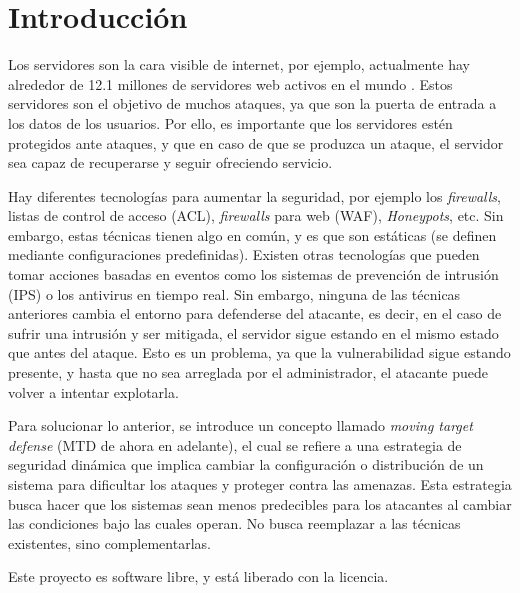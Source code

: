 \chapter{Introducción}

Los servidores son la cara visible de internet, por ejemplo, actualmente hay alrededor de 12.1 millones de servidores web activos en el mundo \cite{netcraft-agosto23}. Estos servidores son el objetivo de muchos ataques, ya que son la puerta de entrada a los datos de los usuarios.\cite{breaches-2023} Por ello, es importante que los servidores estén protegidos ante ataques, y que en caso de que se produzca un ataque, el servidor sea capaz de recuperarse y seguir ofreciendo servicio.

Hay diferentes tecnologías para aumentar la seguridad, por ejemplo los \textit{firewalls}, listas de control de acceso (ACL), \textit{firewalls} para web (WAF), \textit{Honeypots}, etc. Sin embargo, estas técnicas tienen algo en común, y es que son estáticas (se definen mediante configuraciones predefinidas). Existen otras tecnologías que pueden tomar acciones basadas en eventos como los sistemas de prevención de intrusión (IPS) o los antivirus en tiempo real. Sin embargo, ninguna de las técnicas anteriores cambia el entorno para defenderse del atacante, es decir, en el caso de sufrir una intrusión y ser mitigada, el servidor sigue estando en el mismo estado que antes del ataque. Esto es un problema, ya que la vulnerabilidad sigue estando presente, y hasta que no sea arreglada por el administrador, el atacante puede volver a intentar explotarla.

Para solucionar lo anterior, se introduce un concepto llamado \textit{moving target defense} (MTD de ahora en adelante), el cual se refiere a una estrategia de seguridad dinámica que implica cambiar la configuración o distribución de un sistema para dificultar los ataques y proteger contra las amenazas. Esta estrategia busca hacer que los sistemas sean menos predecibles para los atacantes al cambiar las condiciones bajo las cuales operan. No busca reemplazar a las técnicas existentes, sino complementarlas.

Este proyecto es software libre, y está liberado con la licencia\cite{gplv3}.